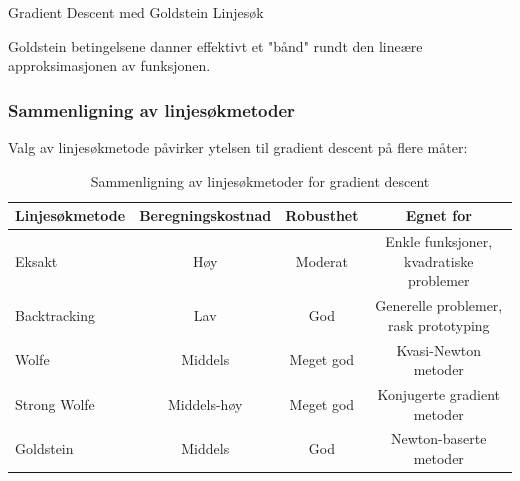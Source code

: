 \begin{algorithm}[H]
	\caption{Gradient Descent med Goldstein Linjesøk}
\end{algorithm}

Goldstein betingelsene danner effektivt et "bånd" rundt den lineære approksimasjonen av funksjonen.

\subsubsection{Sammenligning av linjesøkmetoder}
\label{subsubsec:line_search_comparison}

Valg av linjesøkmetode påvirker ytelsen til gradient descent på flere måter:

\begin{table}[H]
	\centering
	\begin{tabular}{|l|c|c|c|}
		\hline
		\textbf{Linjesøkmetode} & \textbf{Beregningskostnad} & \textbf{Robusthet} & \textbf{Egnet for} \\
		\hline
		Eksakt & Høy & Moderat & Enkle funksjoner, kvadratiske problemer \\
		\hline
		Backtracking & Lav & God & Generelle problemer, rask prototyping \\
		\hline
		Wolfe & Middels & Meget god & Kvasi-Newton metoder \\
		\hline
		Strong Wolfe & Middels-høy & Meget god & Konjugerte gradient metoder \\
		\hline
		Goldstein & Middels & God & Newton-baserte metoder \\
		\hline
	\end{tabular}
	\caption{Sammenligning av linjesøkmetoder for gradient descent}
	\label{tab:line_search_comparison}
\end{table}

